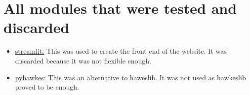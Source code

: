 \documentclass{article}
\begin{document}
\section{All modules that were tested and discarded}
\begin{itemize}
\item \underline{streamlit:} This was used to create the front end of the website. It was discarded because it was not flexible enough.
\item \underline{pyhawkes:} This was an alternative to haweslib. It was not used as hawkeslib proved to be enough.
\end{itemize}
\end{document}
